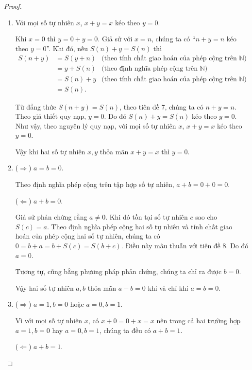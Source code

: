 \begin{proof}
	\begin{enumerate}[label={(\roman*)}]
		\item Với mọi số tự nhiên $x$, $x + y = x$ kéo theo $y = 0$.

		      Khi $x = 0$ thì $y = 0 + y = 0$. Giả sử với $x = n$, chúng ta có ``$n + y = n$ kéo theo $y = 0$''. Khi đó, nếu $S(n) + y = S(n)$ thì
		      \begin{align*}
			      S(n + y) & = S(y + n) & \text{(theo tính chất giao hoán của phép cộng trên $\mathbb{N}$)} \\
			               & = y + S(n) & \text{(theo định nghĩa phép cộng trên $\mathbb{N}$)}              \\
			               & = S(n) + y & \text{(theo tính chất giao hoán của phép cộng trên $\mathbb{N}$)} \\
			               & = S(n).
		      \end{align*}

		      Từ đẳng thức $S(n + y) = S(n)$, theo tiên đề 7, chúng ta có $n + y = n$. Theo giả thiết quy nạp, $y = 0$. Do đó $S(n) + y = S(n)$ kéo theo $y = 0$. Như vậy, theo nguyên lý quy nạp, với mọi số tự nhiên $x$, $x + y = x$ kéo theo $y = 0$.

		      Vậy khi hai số tự nhiên $x, y$ thỏa mãn $x + y = x$ thì $y = 0$.
		\item ($\Rightarrow$) $a = b = 0$.

		      Theo định nghĩa phép cộng trên tập hợp số tự nhiên, $a + b = 0 + 0 = 0$.

		      ($\Leftarrow$) $a + b = 0$.

		      Giả sử phản chứng rằng $a\ne 0$. Khi đó tồn tại số tự nhiên $c$ sao cho $S(c) = a$. Theo định nghĩa phép cộng hai số tự nhiên và tính chất giao hoán của phép cộng hai số tự nhiên, chúng ta có $0 = b + a = b + S(c) = S(b + c)$. Điều này mâu thuẫn với tiên đề 8. Do đó $a = 0$.

		      Tương tự, cũng bằng phương pháp phản chứng, chúng ta chỉ ra được $b = 0$.

		      Vậy hai số tự nhiên $a, b$ thỏa mãn $a + b = 0$ khi và chỉ khi $a = b = 0$.
		\item ($\Rightarrow$) $a = 1, b = 0$ hoặc $a = 0, b = 1$.

		      Vì với mọi số tự nhiên $x$, có $x + 0 = 0 + x = x$ nên trong cả hai trường hợp $a = 1, b = 0$ hay $a = 0, b = 1$, chúng ta đều có $a + b = 1$.

		      ($\Leftarrow$) $a + b = 1$.


\end{enumerate}
\end{proof}
